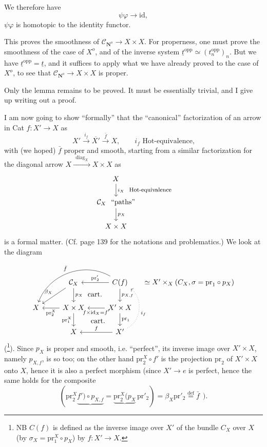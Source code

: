 \documentclass[11pt]{article}
\newcommand{\printedpage}[1]{\marginpar{\footnotesize p.~#1}}
\newcommand{\msp}[1]{\marginpar{\footnotesize [#1]}}
\newcommand{\CN}{\mathcal{C}_{\mathbf{N}^o}}
\begin{document}
We therefore have
\[ \psi\varphi \longrightarrow \mathrm{id}, \]
$\psi\varphi$ is homotopic to the identity functor.

This proves the smoothness of $\CN \longrightarrow X \times X$. For properness, one must prove the smoothness of the case of $X^o$, and of the inverse system $\underline{t}^{\mathrm{opp}} \simeq (t_n^{\mathrm{opp}})_n$. But we have $\underline{t}^{\mathrm{opp}} = \underline{t}$, and it suffices to apply what we have already proved to the case of $X^o$, to see that $\CN \longrightarrow X \times X$ is proper. %

Only the lemma remains to be proved. It must be essentially
\msp{page 170}
trivial, and I give up writing out a proof.

I am now going to show ``formally'' that the ``canonical'' factorization of an arrow in Cat $f : X' \longrightarrow X$ as
\[ X' \xrightarrow{i_f} \overline{X'} \xrightarrow{\bar{f}} X, \qquad i_f \text{ Hot-equivalence,} \]
with (we hoped) $\bar{f}$ proper and smooth, starting from a similar factorization for the diagonal arrow $X \xrightarrow{\ \ \mathrm{diag}_X\ \ } X \times X$ as
\[
\begin{tikzcd}
X \arrow[d, "i_X\ \ \text{\footnotesize Hot-equivalence}"] \\
\mathcal{C}_X\ \ \text{``paths''} \arrow[d, "p_X"] \\
X \times X
\end{tikzcd}
\]
is a formal matter. (Cf. page 139 for the notations and problematics.) We look at the diagram
\[
\begin{tikzcd}
 & \mathcal{C}_X \arrow[d, "p_X"] \arrow[dl, "\beta_X"'] \arrow[dr, phantom, "\text{cart.}"] & C(f) \arrow[l, "\mathrm{pr}'_2"'] \arrow[d, "p_{X,f}"] \arrow[dll, bend right=50, "\bar{f}"'] & [-1.5em] \simeq X' \times_X (C_X, \sigma = \mathrm{pr}_1 \circ p_X) \\ %
X & X \times X \arrow[l, "\mathrm{pr}_2^X"] \arrow[d, "\mathrm{pr}_1^X"'] \arrow[dr, phantom, "\text{cart.}"] & X' \times X \arrow[l, "f \times \mathrm{id}_X = f'"] \arrow[d, "\mathrm{pr}_1"] & \\
 & X & X' \arrow[l, "f"'] \arrow[uu, bend right=60, dotted, "i_f"'] &
\end{tikzcd}
\]
\printedpage{107}
(\footnote[40]{NB $C(f)$ is defined as the inverse image over $X'$ of the bundle $C_X$ over $X$ (by $\sigma_X = \mathrm{pr}_1^X \circ p_X$) by $f : X' \longrightarrow X$.}). Since $p_X$ is proper and smooth, i.e. ``perfect'', its inverse image over $X' \times X$, namely $p_{X,f}$, is so too; on the other hand $\mathrm{pr}_2^X \circ f'$ is the
\msp{page 171}
projection $\mathrm{pr}_2$ of $X' \times X$ onto $X$, hence it is also a perfect morphism (since $X' \longrightarrow e$ is perfect, hence the same holds for the composite
\[ (\mathrm{pr}_2^X \underbrace{f') \circ p_{X,f}} = \underbrace{\mathrm{pr}_2^X(p_X}\, \mathrm{pr}'_2) = \beta_X \mathrm{pr}'_2 \overset{\text{def}}{=} \bar{f} \ \ ). \]
\end{document}
